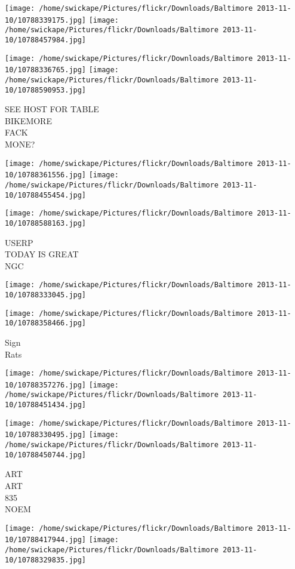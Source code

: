 \documentclass[10pt,letterpaper]{article}
\begin{document}
\texttt{[image: /home/swickape/Pictures/flickr/Downloads/Baltimore 2013-11-10/10788339175.jpg]}
\texttt{[image: /home/swickape/Pictures/flickr/Downloads/Baltimore 2013-11-10/10788457984.jpg]}

\texttt{[image: /home/swickape/Pictures/flickr/Downloads/Baltimore 2013-11-10/10788336765.jpg]}
\texttt{[image: /home/swickape/Pictures/flickr/Downloads/Baltimore 2013-11-10/10788590953.jpg]}

SEE HOST FOR TABLE\\
BIKEMORE\\
FACK\\
MONE?
\pagebreak

\texttt{[image: /home/swickape/Pictures/flickr/Downloads/Baltimore 2013-11-10/10788361556.jpg]}
\texttt{[image: /home/swickape/Pictures/flickr/Downloads/Baltimore 2013-11-10/10788455454.jpg]}

\vspace{0.25in}
\texttt{[image: /home/swickape/Pictures/flickr/Downloads/Baltimore 2013-11-10/10788588163.jpg]}

USERP\\
TODAY IS GREAT\\
NGC
\pagebreak

\texttt{[image: /home/swickape/Pictures/flickr/Downloads/Baltimore 2013-11-10/10788333045.jpg]}

\vspace{0.25in}
\texttt{[image: /home/swickape/Pictures/flickr/Downloads/Baltimore 2013-11-10/10788358466.jpg]}

Sign\\
Rats
\pagebreak

\texttt{[image: /home/swickape/Pictures/flickr/Downloads/Baltimore 2013-11-10/10788357276.jpg]}
\texttt{[image: /home/swickape/Pictures/flickr/Downloads/Baltimore 2013-11-10/10788451434.jpg]}

\texttt{[image: /home/swickape/Pictures/flickr/Downloads/Baltimore 2013-11-10/10788330495.jpg]}
\texttt{[image: /home/swickape/Pictures/flickr/Downloads/Baltimore 2013-11-10/10788450744.jpg]}

ART\\
ART\\
835\\
NOEM
\pagebreak

\texttt{[image: /home/swickape/Pictures/flickr/Downloads/Baltimore 2013-11-10/10788417944.jpg]}
\texttt{[image: /home/swickape/Pictures/flickr/Downloads/Baltimore 2013-11-10/10788329835.jpg]}
\end{document}
